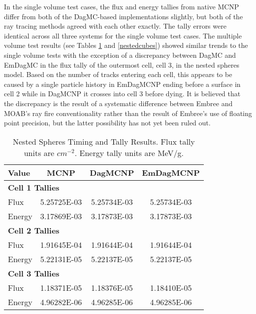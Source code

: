\documentclass{anstrans}
\begin{document}



In the single volume test cases, the flux and energy tallies from native MCNP differ from both of the DagMC-based implementations slightly, but both of the ray tracing methods agreed with each other exactly. The tally errors were identical across all three systems for the single volume test cases. The multiple volume test results (see Tables \ref{nestedspheres} and \ref{nestedcubes}) showed similar trends to the single volume tests with the exception of a discrepancy between DagMC and EmDagMC in the flux tally of the outermost cell, cell 3, in the nested spheres model. Based on the number of tracks entering each cell, this appears to be caused by a single particle history in EmDagMCNP ending before a surface in cell 2 while in DagMCNP it crosses into cell 3 before dying. It is believed that the discrepancy is the result of a systematic difference between Embree and MOAB's ray fire conventionality rather than the result of Embree's use of floating point precision, but the latter possibility has not yet been ruled out.

\begin{table}
  \small
  \begin{center}
    \caption{Nested Spheres Timing and Tally Results. Flux tally units are $cm^{-2}$. Energy tally units are MeV/g.}
    \label{nestedspheres}
    \begin{tabular}{lccc}
      \toprule
      Value & MCNP & DagMCNP & EmDagMCNP \\
      \toprule
      \multicolumn{4}{l}{\textbf{Cell 1 Tallies}} \\
      \hline
      Flux  & 5.25725E-03 & 5.25734E-03 & 5.25734E-03 \\
      Energy  & 3.17869E-03 &  3.17873E-03 &  3.17873E-03 \\
      \hline
      \multicolumn{4}{l}{\textbf{Cell 2 Tallies}} \\
      \hline
      Flux  & 1.91645E-04 & 1.91644E-04 & 1.91644E-04 \\
      Energy  & 5.22131E-05 & 5.22137E-05 & 5.22137E-05 \\
      \hline
      \multicolumn{4}{l}{\textbf{Cell 3 Tallies}} \\
      \hline
      Flux  & 1.18371E-05 & 1.18376E-05 & 1.18410E-05 \\
      Energy  & 4.96282E-06 & 4.96285E-06 & 4.96285E-06 \\
      \bottomrule
                        
    \end{tabular}


  \end{center}
\end{table}
\end{document}
